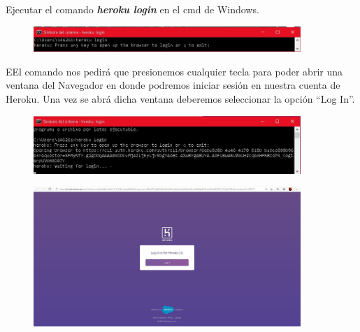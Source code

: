 \documentclass[10pt,a4paper]{article} %
\begin{document}
	\begin{enumerate}
		{\large
			\item Ejecutar el comando \textbf{\textit{heroku login}} en el cmd de Windows.
			\begin{figure}[H]
				\includegraphics[width=0.9\textwidth]{resultado2.jpg}
				\centering
				\label{img:login_paso1}
			\end{figure}
			\item EEl comando nos pedir{\'a} que presionemos cualquier tecla para poder abrir una ventana del Navegador en donde podremos iniciar sesi{\'o}n en nuestra cuenta de Heroku. Una vez se abr{\'a} dicha ventana deberemos seleccionar la opci{\'o}n ``Log In''.
			\begin{figure}[H]
				\includegraphics[width=0.9\textwidth]{resultado3.jpg}
				\centering
				\label{img:login_paso2.1}
				
				
				\vspace{0.5cm}
				\includegraphics[width=0.9\textwidth]{resultado4.jpg}
				\centering
				\label{img:login_paso2.2}
			\end{figure}
			
			\pagebreak
			
}
\end{enumerate}
\end{document}

